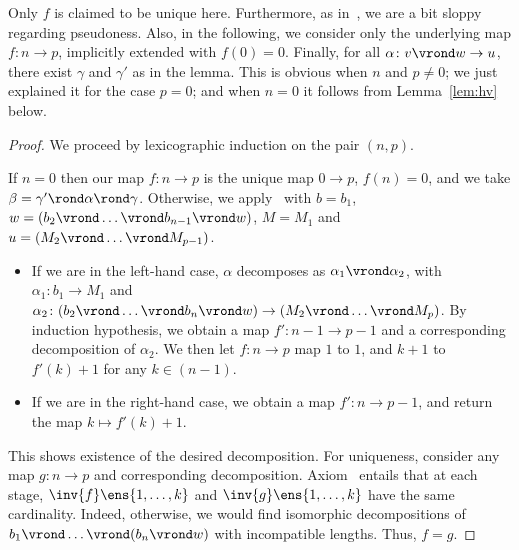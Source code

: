 \documentclass{LMCS}
\theoremstyle{plain}\newtheorem{satz}[thm]{Satz}
\begin{document}
\begin{rem}
  Only $f$ is claimed to be unique here.  Furthermore, as
  in~, we are a bit sloppy regarding pseudoness.
  Also, in the following, we consider only the underlying map $f
  \colon n \to p$, implicitly extended with $f(0) = 0$.  Finally, for
  all $\alpha \colon v \vrond w \to u$, there exist $\gamma$ and
  $\gamma'$ as in the lemma. This is obvious when $n$ and $p \neq 0$;
  we just explained it for the case $p=0$; and when $n=0$ it follows
  from Lemma~\ref{lem:hv} below.
\end{rem}
\begin{proof}
  We proceed by lexicographic induction on the pair $(n,p)$.  

  If $n = 0$ then our map $f \colon n \to p$ is the unique map $0 \to
  p$, $f(n) = 0$, and we take $\beta = \gamma' \rond \alpha \rond
  \gamma$.  Otherwise, we apply~ with $b = b_1$,
  $w = (b_{2} \vrond \ldots \vrond b_{n-1} \vrond w)$, $M = M_1$ and
  $u = (M_2 \vrond \ldots \vrond M_{p-1})$.
    \begin{itemize}
    \item If we are in the left-hand case, $\alpha$ decomposes as
      $\alpha_1 \vrond \alpha_2$, with $\alpha_1 \colon b_1 \to M_1$
      and $\alpha_2 \colon (b_2 \vrond \ldots \vrond b_{n} \vrond w)
      \to (M_2 \vrond \ldots \vrond M_{p})$.  By induction hypothesis,
      we obtain a map $f' \colon n-1 \to p-1$ and a
      corresponding decomposition of $\alpha_2$.  We then let
      $f \colon n \to p$ map $1$ to $1$, and $k + 1$ to
      $f'(k) + 1$ for any $k \in (n-1)$.
    \item If we are in the right-hand case, we obtain a map
      $f' \colon n \to p-1$, and return the map $k
      \mapsto f'(k) + 1$.
    \end{itemize}
    This shows existence of the desired decomposition. For uniqueness,
    consider any map $g \colon n \to p$ and corresponding
    decomposition.  Axiom~ entails that at
    each stage, $\inv{f}\ens{1,\ldots,k}$ and
    $\inv{g}\ens{1,\ldots,k}$ have the same cardinality. Indeed,
    otherwise, we would find isomorphic decompositions of $b_1 \vrond
    \ldots \vrond (b_n \vrond w)$ with incompatible lengths.  Thus, $f
    = g$.
\end{proof}
\end{document}
